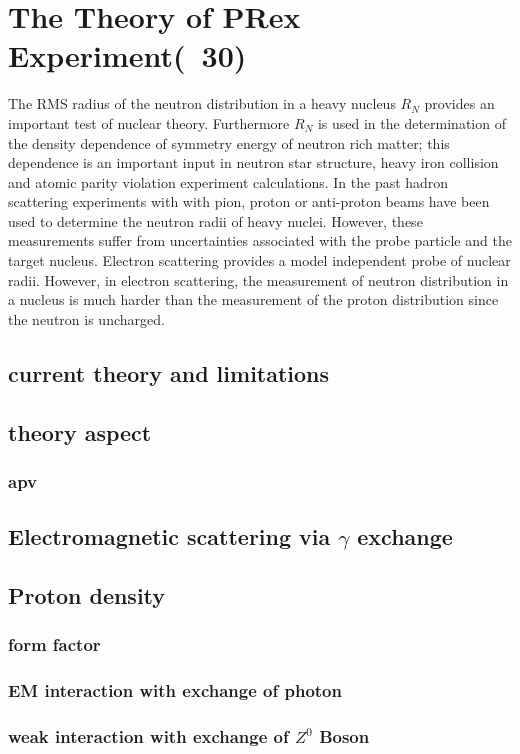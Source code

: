 \chapter{The Theory of PRex Experiment(~30)}

The RMS radius of the  neutron distribution in a heavy nucleus  $R_N$ provides an important test of nuclear theory. Furthermore   $R_N$ is used in the determination of  the density dependence of symmetry energy of neutron rich matter; this dependence is an  important input in   neutron star structure, heavy iron collision and atomic parity violation experiment calculations. In the past hadron scattering experiments with with pion, proton or anti-proton beams have been used to determine the neutron radii of heavy nuclei. However, these measurements suffer from uncertainties associated with the probe particle and the target nucleus. Electron scattering provides a model independent probe of nuclear radii.  However, in electron scattering, the measurement of neutron distribution in a nucleus  is much harder than the measurement of the proton distribution  since the neutron is uncharged. 
\section{current theory and limitations}
\section{theory aspect}
\subsection{apv}
\section{Electromagnetic scattering via $\gamma$ exchange}
\section{Proton density}
\subsection{form factor}
\subsection{EM interaction with exchange of photon}
\subsection{weak interaction with exchange of $Z^0$ Boson}
